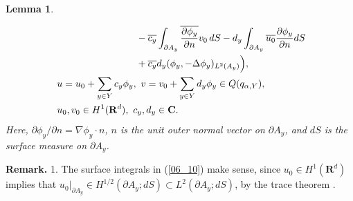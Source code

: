 \documentclass[12pt,a4paper]{article}
\newtheorem{lemma}[theorem]{Lemma}
\begin{document}
\begin{lemma}
\begin{enumerate}
\begin{align}
&
\hspace{3cm}
-\overline{c_y}\int_{\partial A_y}\overline{\frac{\partial \phi_y}{\partial n}}v_0\,dS
-d_y\int_{\partial A_y}\overline{u_0}\frac{\partial \phi_y}{\partial n}dS
\notag\\
&\hspace{3cm}+
\overline{c_y}d_y(\phi_y,-\Delta \phi_y)_{L^2(A_y)}
\Bigr),
\label{06_10}
\\
&\ 
u=u_0+\sum_{y\in Y}c_y\phi_y,\ 
v=v_0+\sum_{y\in Y}d_y \phi_y\in Q(q_{\alpha,Y}),\notag\\
&\ 
u_0,v_0\in H^1(\mathbf{R}^d),\ c_y,d_y\in \mathbf{C}.
\notag
\end{align}
Here, $\partial \phi_y/\partial n=\nabla \phi_y\cdot n$,
$n$ is the unit outer normal vector on $\partial A_y$,
and $dS$ is the surface measure on $\partial A_y$.
\end{enumerate}
\end{lemma}
\noindent\textbf{Remark.}
1. The surface integrals in (\ref{06_10}) make sense,
since $u_0\in H^1(\mathbf{R}^d)$ implies that
$u_0|_{\partial A_y}\in H^{1/2}(\partial A_y;dS)\subset L^2(\partial A_y;dS)$,
by the trace theorem \cite[section 8]{Wl}.
\end{document}
